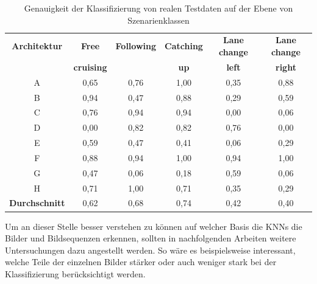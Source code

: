 \begin{table}[h]
\small
\centering
\def\arraystretch{1.4}
\begin{tabular}{c c c c c c}
\textbf{Architektur} & \textbf{Free} & \textbf{Following} & \textbf{Catching} & \textbf{Lane change} & \textbf{Lane change} \\
 & \textbf{cruising} & & \textbf{up} & \textbf{left} & \textbf{right} \\
\hline
A & 0,65 & 0,76 & 1,00 & 0,35 & 0,88 \\
B & 0,94 & 0,47 & 0,88 & 0,29 & 0,59 \\
C & 0,76 & 0,94 & 0,94 & 0,00 & 0,06 \\
D & 0,00 & 0,82 & 0,82 & 0,76 & 0,00 \\
E & 0,59 & 0,47 & 0,41 & 0,06 & 0,29 \\
F & 0,88 & 0,94 & 1,00 & 0,94 & 1,00 \\
G & 0,47 & 0,06 & 0,18 & 0,59 & 0,06 \\
H & 0,71 & 1,00 & 0,71 & 0,35 & 0,29 \\
\hline
\textbf{Durchschnitt} & 0,62 & 0,68 & 0,74 & 0,42 & 0,40 \\
\hline
\end{tabular}
\caption{Genauigkeit der Klassifizierung von realen Testdaten auf der Ebene von Szenarienklassen}
\label{tab_ergebnis_szenarien}
\end{table}

Um an dieser Stelle besser verstehen zu können auf welcher Basis die \acp{KNN} die Bilder und Bildsequenzen erkennen, sollten in nachfolgenden Arbeiten weitere Untersuchungen dazu angestellt werden. So wäre es beispielsweise interessant, welche Teile der einzelnen Bilder stärker oder auch weniger stark bei der Klassifizierung berücksichtigt werden.








